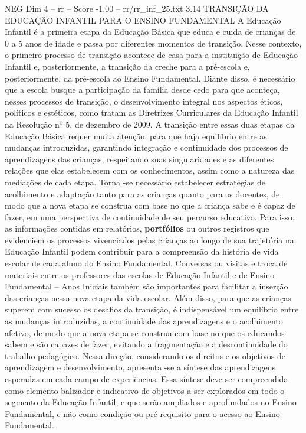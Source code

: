 \begin{textsample}{NEG Dim 4 – rr – Score -1.00 – rr/rr\_inf\_25.txt}  \label{ex:f4_neg_179}
3.14 TRANSIÇÃO DA EDUCAÇÃO INFANTIL PARA O ENSINO FUNDAMENTAL A Educação Infantil é a primeira etapa da Educação Básica que educa e cuida de crianças de 0 a 5 anos de idade e passa por diferentes momentos de transição.
Nesse contexto, o primeiro processo de transição acontece de casa para a instituição de Educação Infantil e, posteriormente, a transição da creche para a pré-escola e, posteriormente, da pré-escola ao Ensino Fundamental.
Diante disso, é necessário que a escola busque a participação da família desde cedo para que aconteça, nesses processos de transição, o desenvolvimento integral nos aspectos éticos, políticos e estéticos, como tratam as Diretrizes Curriculares da Educação Infantil na Resolução nº 5, de dezembro de 2009.
A transição entre essas duas etapas da Educação Básica requer muita atenção, para que haja equilíbrio entre as mudanças introduzidas, garantindo integração e continuidade dos processos de aprendizagens das crianças, respeitando suas singularidades e as diferentes relações que elas estabelecem com os conhecimentos, assim como a natureza das mediações de cada etapa.
Torna -se necessário estabelecer estratégias de acolhimento e adaptação tanto para as crianças quanto para os docentes, de modo que a nova etapa se construa com base no que a criança sabe e é capaz de fazer, em uma perspectiva de continuidade de seu percurso educativo.
Para isso, as informações contidas em relatórios, \textbf{portfólios} ou outros registros que evidenciem os processos vivenciados pelas crianças ao longo de sua trajetória na Educação Infantil podem contribuir para a compreensão da história de vida escolar de cada aluno do Ensino Fundamental.
Conversas ou visitas e troca de materiais entre os professores das escolas de Educação Infantil e de Ensino Fundamental – Anos Iniciais também são importantes para facilitar a inserção das crianças nessa nova etapa da vida escolar.
Além disso, para que as crianças superem com sucesso os desafios da transição, é indispensável um equilíbrio entre as mudanças introduzidas, a continuidade das aprendizagens e o acolhimento afetivo, de modo que a nova etapa se construa com base no que os educandos sabem e são capazes de fazer, evitando a fragmentação e a descontinuidade do trabalho pedagógico.
Nessa direção, considerando os direitos e os objetivos de aprendizagem e desenvolvimento, apresenta -se a síntese das aprendizagens esperadas em cada campo de experiências.
Essa síntese deve ser compreendida como elemento balizador e indicativo de objetivos a ser explorados em todo o segmento da Educação Infantil, e que serão ampliados e aprofundados no Ensino Fundamental, e não como condição ou pré-requisito para o acesso ao Ensino Fundamental.

\end{textsample}
